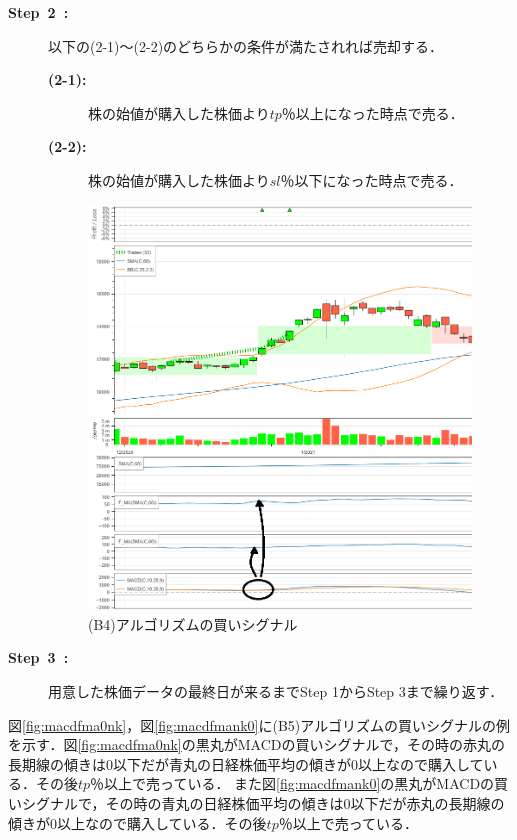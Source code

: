 \begin{description}
    
    \item[\textbf{Step~2~:}]以下の(2-1)～(2-2)のどちらかの条件が満たされれば売却する．
     \begin{description}
      \item[\textbf{(2-1):}]株の始値が購入した株価より$tp$％以上になった時点で売る．
      \item[\textbf{(2-2):}]株の始値が購入した株価より$sl$％以下になった時点で売る． 
     \end{description}
     \begin{figure}[H]
      \centering
      \includegraphics[width=110mm]{fig/macd_and_nk_and_fma_paint.png}
      \caption{(B4)アルゴリズムの買いシグナル}
      \label{fig:macdfmank}
     \end{figure}
    \item[\textbf{Step~3~:}]用意した株価データの最終日が来るまでStep 1からStep 3まで繰り返す．
\end{description}

  
 図\ref{fig:macdfma0nk}，図\ref{fig:macdfmank0}に(B5)アルゴリズムの買いシグナルの例を示す．図\ref{fig:macdfma0nk}の黒丸がMACDの買いシグナルで，その時の赤丸の長期線の傾きは0以下だが青丸の日経株価平均の傾きが0以上なので購入している．その後$tp$％以上で売っている．
 また図\ref{fig:macdfmank0}の黒丸がMACDの買いシグナルで，その時の青丸の日経株価平均の傾きは0以下だが赤丸の長期線の傾きが0以上なので購入している．その後$tp$％以上で売っている．
